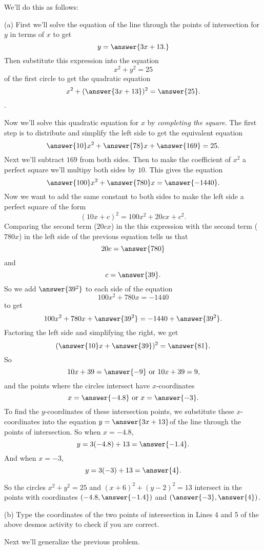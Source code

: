 \documentclass{ximera}
\begin{document}
\begin{explanation}
\begin{question}
We'll do this as follows:

(a) First we'll solve the equation of the line through the points of intersection for $y$ in terms of $x$ to get
\[
     y = \answer{3x+13.}
\]
Then substitute this expression into the equation
\[
   x^2 + y^2 = 25
\]
of the first circle to get the quadratic equation
\[
        x^2 + (\answer{3x+13})^2 = \answer{25}. 
\]. 

Now we'll solve this quadratic equation for $x$ by \emph{completing the square}. The first step is to distribute and simplify the left side to get the equivalent equation
\[
    \answer{10}x^2 + \answer{78}x + \answer{169} = 25.
\]
Next we'll subtract $169$ from both sides. Then to make the coefficient of $x^2$ a perfect square we'll multipy both sides by $10$. This gives the equation
\[
      \answer{100}x^2 + \answer{780}x = \answer{-1440} .
\]
Now we want to add the same constant to both sides to make the left side a perfect square of the form
\[
      (10x + c)^2 = 100x^2 + 20cx + c^2 .
\]
Comparing the second term ($20cx$) in the this expression with the second term ($780x$) in the left side of the previous equation  tells us that 
\[
     20c = \answer{780} 
\]
and
\[
    c = \answer{39} .
\]
So we add $\answer{39^2}$ to each side of the equation
\[
   100x^2 + 780x = -1440
\]
to get
\[
  100x^2 + 780x + \answer{39^2} = -1440 + \answer{39^2} .
\]
Factoring the left side and simplifying the right, we get
\[
        (\answer{10}x + \answer{39})^2 = \answer{81} .
\]
So
\[
        10x + 39 = \answer{-9}  \text{ or } 10x+39 = 9 ,
\]
and the points where the circles intersect have $x$-coordinates
\[
      x = \answer{-4.8} \text{ or } x = \answer{-3} .
\]
To find the $y$-coordinates of these intersection points, we substitute these $x$-coordinates into the equation $y=\answer{3x+13}$of the line through the points of intersection. So when $x=-4.8$, 
\[
   y = 3(-4.8)+13 = \answer{-1.4} . 
\]
And when $x=-3$,
\[
   y = 3(-3)+13 = \answer{4} . 
\]

So the circles $x^2 + y^2 = 25$ and $(x+6)^2+(y-2)^2=13$ intersect in the points with coordinates $(-4.8,\answer{-1.4})$ and $(\answer{-3}, \answer{4})$.

(b) Type the coordinates of the two points of intersection in Lines 4 and 5 of the above desmos activity to check if you are correct. 
\end{question}

\end{explanation}

Next we'll generalize the previous problem.
\end{document}
